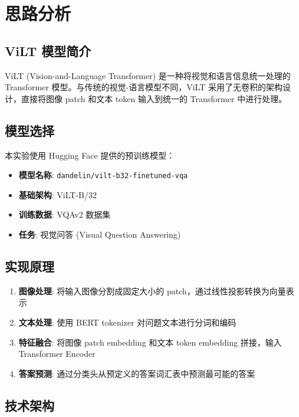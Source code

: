 \documentclass[a4paper]{article}
\begin{document}
\section{思路分析}

\subsection{ViLT 模型简介}

ViLT (Vision-and-Language Transformer) 是一种将视觉和语言信息统一处理的 Transformer 模型。与传统的视觉-语言模型不同，ViLT 采用了无卷积的架构设计，直接将图像 patch 和文本 token 输入到统一的 Transformer 中进行处理。

\subsection{模型选择}

本实验使用 Hugging Face 提供的预训练模型：
\begin{itemize}
    \item \textbf{模型名称}: \texttt{dandelin/vilt-b32-finetuned-vqa}
    \item \textbf{基础架构}: ViLT-B/32
    \item \textbf{训练数据}: VQAv2 数据集
    \item \textbf{任务}: 视觉问答 (Visual Question Answering)
\end{itemize}

\subsection{实现原理}

\begin{enumerate}
    \item \textbf{图像处理}: 将输入图像分割成固定大小的 patch，通过线性投影转换为向量表示
    \item \textbf{文本处理}: 使用 BERT tokenizer 对问题文本进行分词和编码
    \item \textbf{特征融合}: 将图像 patch embedding 和文本 token embedding 拼接，输入 Transformer Encoder
    \item \textbf{答案预测}: 通过分类头从预定义的答案词汇表中预测最可能的答案
\end{enumerate}

\subsection{技术架构}
\end{document}
